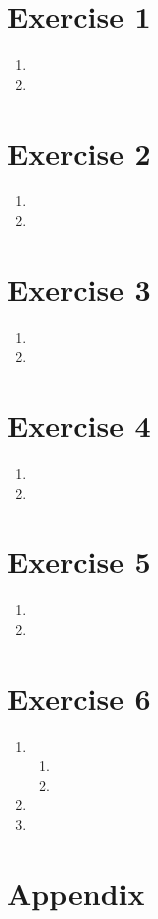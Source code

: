 \documentclass[12pt]{article}
\begin{document}
\section*{Exercise 1}
\begin{enumerate}[label=(\alph*)]
	\item
	\item
\end{enumerate}

\section*{Exercise 2}
\begin{enumerate}[label=(\alph*)]
	\item
	\item
\end{enumerate}

\section*{Exercise 3}
\begin{enumerate}[label=(\alph*)]
	\item
	\item
\end{enumerate}

\section*{Exercise 4}
\begin{enumerate}[label=(\alph*)]
	\item
	\item
\end{enumerate}

\section*{Exercise 5}
\begin{enumerate}[label=(\alph*)]
	\item
	\item
\end{enumerate}

\section*{Exercise 6}
\begin{enumerate}[label=(\alph*)]
	\item	\begin{enumerate}[label=(\roman*)]
				\item
				\item
			\end{enumerate}
	\item
	\item
\end{enumerate}

\section*{Appendix}\label{appendix}
\end{document}

